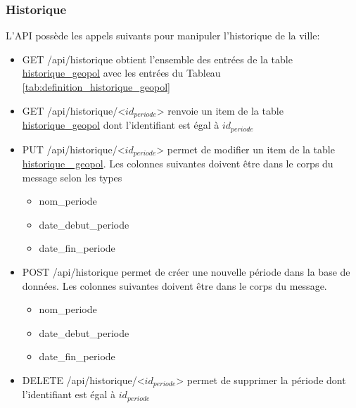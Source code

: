 \subsubsection{Historique}
L'\ac{API}  possède les appels suivants pour manipuler l'historique de la ville:
\begin{itemize}
    \item GET /api/historique obtient l'ensemble des entrées de la table \ul{historique\_geopol} avec les entrées du Tableau \ref{tab:definition_historique_geopol}
    \item GET /api/historique/<$id_{periode}$> renvoie un item de la table \ul{historique\_geopol} dont l'identifiant est égal à $id_{periode}$
    \item PUT /api/historique/<$id_{periode}$> permet de modifier un item de la table \ul{historique\_ geopol}. Les colonnes suivantes doivent être dans le corps du message selon les types 
    \begin{itemize}
        \item nom\_periode 
        \item date\_debut\_periode
        \item date\_fin\_periode
    \end{itemize}
    \item POST /api/historique permet de créer une nouvelle période dans la base de données. Les colonnes suivantes doivent être dans le corps du message.
    \begin{itemize}
        \item nom\_periode 
        \item date\_debut\_periode
        \item date\_fin\_periode
    \end{itemize}
    \item DELETE /api/historique/<$id_{periode}$> permet de supprimer la période dont l'identifiant est égal à $id_{periode}$
\end{itemize}
\clearpage
